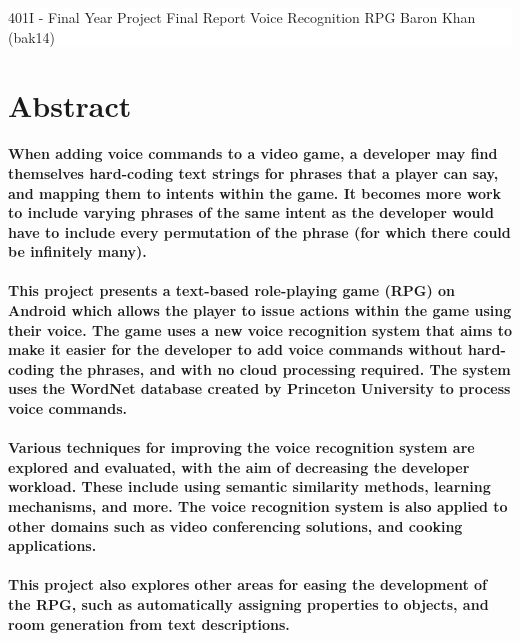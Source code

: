\documentclass[11pt]{article}
\date{16 March 2017}
\begin{document}
\vspace*{6cm}
\colorbox{white}{
	\parbox[t]{1.0\linewidth}{
		\centering \fontsize{50pt}{80pt}\selectfont %
		\vspace*{0.7cm} %

		{401I - Final Year Project} \break
		\vspace*{0.7cm}
		Final Report
		\break
		Voice Recognition RPG
		\break
		Baron Khan (bak14)
		\vspace*{0.7cm} %
	}
}
\vfill %




\newpage
\thispagestyle{empty}
\tableofcontents
\newpage
\setcounter{page}{1}
\section{Abstract}

\textbf{When adding voice commands to a video game, a developer may find themselves hard-coding text strings for phrases that a player can say, and mapping them to intents within the game. It becomes more work to include varying phrases of the same intent as the developer would have to include every permutation of the phrase (for which there could be infinitely many).
\\
\\
This project presents a text-based role-playing game (RPG) on Android which allows the player to issue actions within the game using their voice. The game uses a new voice recognition system that aims to make it easier for the developer to add voice commands without hard-coding the phrases, and with no cloud processing required. The system uses the WordNet database created by Princeton University to process voice commands.
\\
\\
Various techniques for improving the voice recognition system are explored and evaluated, with the aim of decreasing the developer workload. These include using semantic similarity methods, learning mechanisms, and more. The voice recognition system is also applied to other domains such as video conferencing solutions, and cooking applications.
\\
\\
This project also explores other areas for easing the development of the RPG, such as automatically assigning properties to objects, and room generation from text descriptions.}
\end{document}
